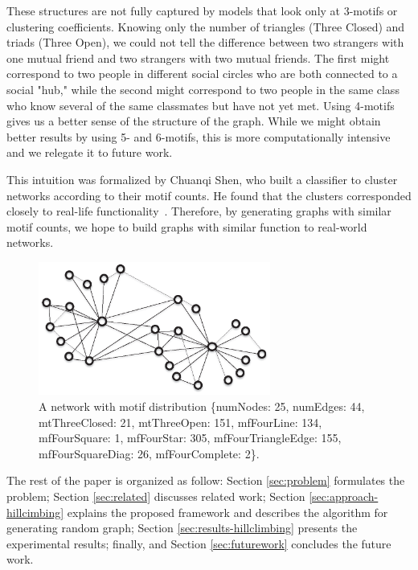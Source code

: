 These structures are not fully captured by models that look only at
3-motifs or clustering coefficients.  Knowing only the number of triangles
(Three Closed) and triads (Three Open), we could not tell the difference
between two strangers with one mutual friend and two strangers with two
mutual friends.  The first might correspond to two people in different
social circles who are both connected to a social "hub," while the
second might correspond to two people in the same class who know
several of the same classmates but have not yet met.  Using 4-motifs gives
us a better sense of the structure of the graph.  While
we might obtain better results by using 5- and 6-motifs, this is more
computationally intensive and we relegate it to future work.

This intuition was formalized by Chuanqi Shen, who built a classifier to
cluster networks according to their motif counts.  He found that the
clusters corresponded closely to real-life functionality~\cite{chuanqi}.
Therefore, by generating graphs with similar motif counts, we hope to build 
graphs with similar function to real-world networks.

\begin{figure}[t]
\centering
\includegraphics[width=3in]{Figures/network.eps}
\caption{A network with motif distribution \{numNodes: 25, numEdges: 44,
mtThreeClosed: 21, mtThreeOpen: 151, mfFourLine: 134,
mfFourSquare: 1, mfFourStar: 305, mfFourTriangleEdge: 155,
mfFourSquareDiag: 26, mfFourComplete: 2\}.}
\label{fig:network}
\end{figure}


The rest of the paper is organized as follow: Section \ref{sec:problem}
formulates the problem; Section \ref{sec:related} discusses related work;
Section \ref{sec:approach-hillcimbing} explains the proposed framework 
and describes the algorithm for generating random graph; Section
\ref{sec:results-hillclimbing} presents the experimental results; finally,  and Section \ref{sec:futurework} concludes the future work.



